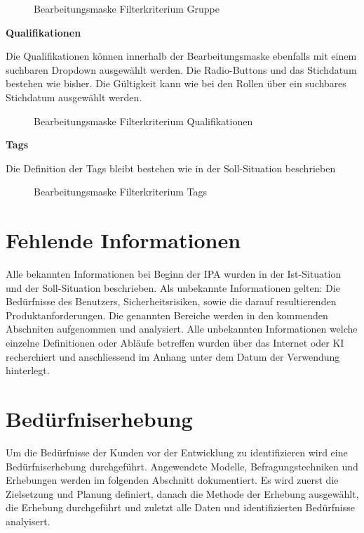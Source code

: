 \begin{figure}[h]
   \centering
   \caption{Bearbeitungsmaske Filterkriterium Gruppe}
\end{figure}

\newpage

\textbf{Qualifikationen}

Die Qualifikationen können innerhalb der Bearbeitungsmaske ebenfalls mit einem suchbaren Dropdown 
ausgewählt werden. Die Radio-Buttons und das Stichdatum bestehen wie bisher. Die Gültigkeit kann wie bei den Rollen über 
ein suchbares Stichdatum ausgewählt werden.

\begin{figure}[h]
   \centering
   \caption{Bearbeitungsmaske Filterkriterium Qualifikationen}
\end{figure}

\textbf{Tags}

Die Definition der Tags bleibt bestehen wie in der Soll-Situation beschrieben

\begin{figure}[h]
   \centering
   \caption{Bearbeitungsmaske Filterkriterium Tags}
\end{figure}

\newpage

\section{Fehlende Informationen}
Alle bekannten Informationen bei Beginn der IPA wurden in der Ist-Situation und der Soll-Situation beschrieben.
Als unbekannte Informationen gelten: Die Bedürfnisse des Benutzers, Sicherheitsrisiken, sowie die darauf resultierenden Produktanforderungen.
Die genannten Bereiche werden in den kommenden Abschniten aufgenommen und analysiert. Alle unbekannten Informationen welche einzelne 
Definitionen oder Abläufe betreffen wurden über das Internet oder KI recherchiert und anschliessend im Anhang unter dem Datum der Verwendung hinterlegt.

\newpage

\section{Bedürfniserhebung}
Um die Bedürfnisse der Kunden vor der Entwicklung zu identifizieren wird eine Bedürfniserhebung durchgeführt. 
Angewendete Modelle, Befragungstechniken und Erhebungen werden im folgenden Abschnitt dokumentiert. Es wird zuerst die Zielsetzung und Planung definiert,
danach die Methode der Erhebung ausgewählt, die Erhebung durchgeführt und zuletzt alle Daten und identifizierten Bedürfnisse analyisert.

